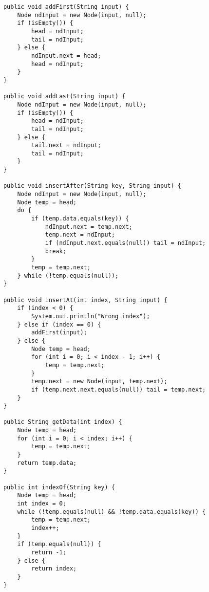 \documentclass[12pt,titlepage]{article}
\begin{document}
\begin{enumerate}
\begin{verbatim}
            public void addFirst(String input) {
                Node ndInput = new Node(input, null);
                if (isEmpty()) {
                    head = ndInput;
                    tail = ndInput;
                } else {
                    ndInput.next = head;
                    head = ndInput;
                }
            }

            public void addLast(String input) {
                Node ndInput = new Node(input, null);
                if (isEmpty()) {
                    head = ndInput;
                    tail = ndInput;
                } else {
                    tail.next = ndInput;
                    tail = ndInput;
                }
            }

            public void insertAfter(String key, String input) {
                Node ndInput = new Node(input, null);
                Node temp = head;
                do {
                    if (temp.data.equals(key)) {
                        ndInput.next = temp.next;
                        temp.next = ndInput;
                        if (ndInput.next.equals(null)) tail = ndInput;
                        break;
                    }
                    temp = temp.next;
                } while (!temp.equals(null));
            }

            public void insertAt(int index, String input) {
                if (index < 0) {
                    System.out.println("Wrong index");
                } else if (index == 0) {
                    addFirst(input);
                } else {
                    Node temp = head;
                    for (int i = 0; i < index - 1; i++) {
                        temp = temp.next;
                    }
                    temp.next = new Node(input, temp.next);
                    if (temp.next.next.equals(null)) tail = temp.next;
                }
            }

            public String getData(int index) {
                Node temp = head;
                for (int i = 0; i < index; i++) {
                    temp = temp.next;
                }
                return temp.data;
            }

            public int indexOf(String key) {
                Node temp = head;
                int index = 0;
                while (!temp.equals(null) && !temp.data.equals(key)) {
                    temp = temp.next;
                    index++;
                }
                if (temp.equals(null)) {
                    return -1;
                } else {
                    return index;
                }
            }


\end{verbatim}
\end{enumerate}
\end{document}

